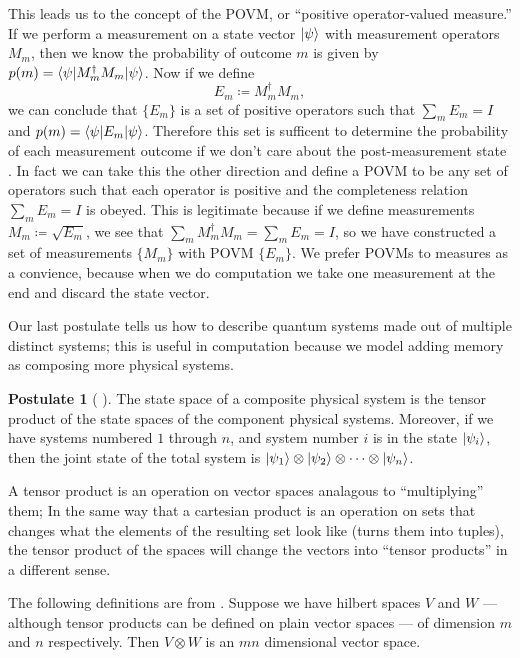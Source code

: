 \documentclass[12pt,twoside]{reedthesis}
\theoremstyle{plain}   %
\theoremstyle{definition}
\newtheorem{post}{Postulate}[section]
\theoremstyle{remark}
\numberwithin{equation}{section}
\begin{document}
   This leads us to the concept of the POVM, or ``positive operator-valued measure.''
   If we perform a measurement on a state vector $\ket{\psi}$ with measurement operators $M_m$, then we know the probability of outcome $m$ is given by $p(m) = \braket{\psi | M_m^\dag M_m | \psi}$.
   Now if we define
   \[ E_m \coloneq M_m^\dag M_m,\]
   we can conclude that $\{E_m\}$ is a set of positive operators such that $\sum_m E_m = I$ and $p(m) = \braket{\psi | E_m | \psi}$.
   Therefore this set is sufficent to determine the probability of each measurement outcome if we don't care about the post-measurement state \cite[2.2.6]{nielsen2010}.
   In fact we can take this the other direction and define a POVM to be any set of operators such that each operator is positive and the
   completeness relation $\sum_m E_m = I$ is obeyed.
   This is legitimate because if we define measurements $M_m \coloneq \sqrt{E_m}$, we see that $\sum_m M_m^\dag M_m = \sum_m E_m = I$,
   so we have constructed a set of measurements $\{M_m\}$ with POVM $\{E_m\}$.
   We prefer POVMs to measures as a convience, because when we do computation we take one measurement at the end and discard the state vector. \par
   Our last postulate tells us how to describe quantum systems made out of multiple distinct systems; this is useful in computation because we model adding memory as
   composing more physical systems.
   \begin{post}[{ \cite[2.2.8]{nielsen2010} }] 
     The state space of a composite physical system is the tensor product of the state spaces of the component physical systems. Moreover,
     if we have systems numbered $1$ through $n$, and system number $i$ is in the state $\ket{\psi_i }$, then the joint state of the total system is $\ket{\psi_1} \otimes \ket{\psi_2} \otimes \cdots \otimes \ket{\psi_n}$.
   \end{post}
   A tensor product is an operation on vector spaces analagous to ``multiplying'' them;
   In the same way that a cartesian product is an operation on sets that changes what the elements of the resulting set look like (turns them into tuples),
   the tensor product of the spaces will change the vectors into ``tensor products'' in a different sense.
   \par
   The following definitions are from \cite[2.1.7]{nielsen2010}.
   Suppose we have hilbert spaces $V$ and $W$ --- although tensor products can be defined on plain vector spaces --- of dimension $m$ and $n$ respectively.
   Then $V \otimes W$ is an $mn$ dimensional vector space.
\end{document}
